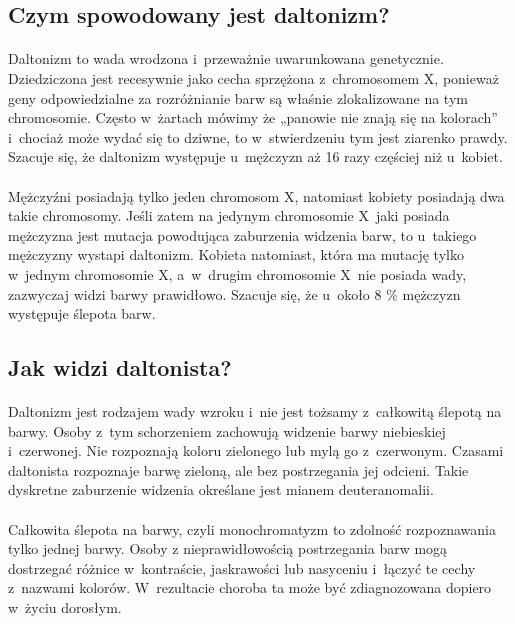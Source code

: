\documentclass[12pt, letterpaper]{article}
\begin{document}
\subsection{Czym spowodowany jest daltonizm?}
\paragraph{}
Daltonizm to wada wrodzona i~przeważnie uwarunkowana genetycznie. Dziedziczona jest recesywnie jako cecha sprzężona z~chromosomem X, ponieważ geny odpowiedzialne za rozróżnianie barw są właśnie zlokalizowane na tym chromosomie. Często w~żartach mówimy że „panowie nie znają się na kolorach” i~chociaż może wydać się to dziwne, to w~stwierdzeniu tym jest ziarenko prawdy. Szacuje się, że daltonizm występuje u~mężczyzn aż 16 razy częściej niż u~kobiet.
\paragraph{}
Mężczyźni posiadają tylko jeden chromosom X, natomiast kobiety posiadają dwa takie chromosomy. Jeśli zatem na jedynym chromosomie X~jaki posiada mężczyzna jest mutacja powodująca zaburzenia widzenia barw, to u~takiego mężczyzny wystapi daltonizm. Kobieta natomiast, która ma mutację tylko w~jednym chromosomie X, a~w~drugim chromosomie X~nie posiada wady, zazwyczaj widzi barwy prawidłowo. Szacuje się, że u~około 8 \% mężczyzn występuje ślepota barw.

\subsection{Jak widzi daltonista?}

\paragraph{}
Daltonizm jest rodzajem wady wzroku i~nie jest tożsamy z~całkowitą ślepotą na barwy. Osoby z~tym schorzeniem zachowują widzenie barwy niebieskiej i~czerwonej. Nie rozpoznają koloru zielonego lub mylą go z~czerwonym. Czasami daltonista rozpoznaje barwę zieloną, ale bez postrzegania jej odcieni. Takie dyskretne zaburzenie widzenia określane jest mianem deuteranomalii.

\paragraph{}
Całkowita ślepota na barwy, czyli monochromatyzm to zdolność rozpoznawania tylko jednej barwy. Osoby z nieprawidłowością postrzegania barw mogą dostrzegać różnice w~kontraście, jaskrawości lub nasyceniu i~łączyć te cechy z~nazwami kolorów. W~rezultacie choroba ta może być zdiagnozowana dopiero w~życiu dorosłym. 
\end{document}
